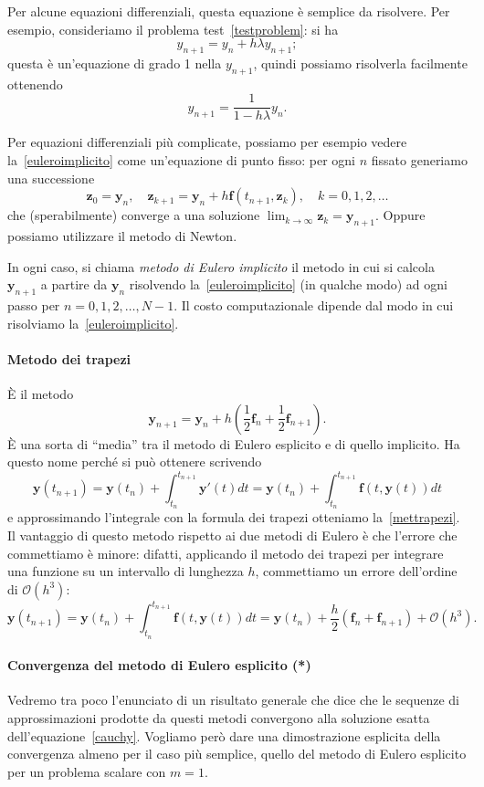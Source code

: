 \documentclass[a4paper]{report}
\theoremstyle{definiton}
\theoremstyle{remark}
\newcommand{\y}{\mathbf{y}}
\newcommand{\z}{\mathbf{z}}
\newcommand{\f}{\mathbf{f}}
\begin{document}
Per alcune equazioni differenziali, questa equazione è semplice da risolvere. Per esempio, consideriamo il problema test~\eqref{testproblem}: si ha
\[
    y_{n+1} = y_n + h\lambda y_{n+1};
\]
questa è un'equazione di grado 1 nella $y_{n+1}$, quindi possiamo risolverla facilmente ottenendo
\[
y_{n+1} = \frac{1}{1-h\lambda} y_n.
\]

Per equazioni differenziali più complicate, possiamo per esempio vedere la~\eqref{euleroimplicito} come un'equazione di punto fisso: per ogni $n$ fissato generiamo una successione
\[
\z_0 = \y_n, \quad \z_{k+1} = \y_n + h \f(t_{n+1}, \z_k), \quad k=0,1,2,\dots
\]
che (sperabilmente) converge a una soluzione $\lim_{k\to\infty} \z_k = \y_{n+1}$. Oppure possiamo utilizzare il metodo di Newton. 

In ogni caso, si chiama \emph{metodo di Eulero implicito} il metodo in cui si calcola $\y_{n+1}$ a partire da $\y_n$ risolvendo la~\eqref{euleroimplicito} (in qualche modo) ad ogni passo per $n=0,1,2,\dots,N-1$. Il costo computazionale dipende dal modo in cui risolviamo la~\eqref{euleroimplicito}.

\paragraph{Metodo dei trapezi}
È il metodo
\begin{equation} \label{mettrapezi}
    \y_{n+1} = \y_n + h\left(\frac12 \f_n + \frac12 \f_{n+1}\right).    
\end{equation}
È una sorta di ``media'' tra il metodo di Eulero esplicito e di quello implicito. Ha questo nome perché si può ottenere scrivendo
\[
\y(t_{n+1}) = \y(t_n) + \int_{t_n}^{t_{n+1}} \y'(t) dt = \y(t_n) + \int_{t_n}^{t_{n+1}} \f(t,\y(t)) dt
\]
e approssimando l'integrale con la formula dei trapezi otteniamo la~\eqref{mettrapezi}. Il vantaggio di questo metodo rispetto ai due metodi di Eulero è che l'errore che commettiamo è minore: difatti, applicando il metodo dei trapezi per integrare una funzione su un intervallo di lunghezza $h$, commettiamo un errore dell'ordine di $\mathcal{O}(h^3)$:
\[
    \y(t_{n+1}) = \y(t_n) + \int_{t_n}^{t_{n+1}} \f(t,\y(t)) dt = \y(t_n) + \frac{h}{2}(\f_n + \f_{n+1}) + \mathcal{O}(h^3).
\]

\paragraph{Convergenza del metodo di Eulero esplicito (*)}
Vedremo tra poco l'enunciato di un risultato generale che dice che le sequenze di approssimazioni prodotte da questi metodi convergono alla soluzione esatta dell'equazione~\eqref{cauchy}. Vogliamo però dare una dimostrazione esplicita della convergenza almeno per il caso più semplice, quello del metodo di Eulero esplicito per un problema scalare con $m=1$.
\end{document}
